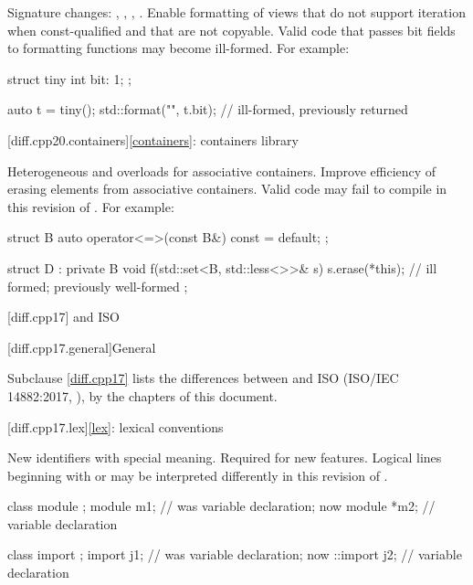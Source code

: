 \change
Signature changes: , , ,
.
\rationale
Enable formatting of views
that do not support iteration when const-qualified and
that are not copyable.
\effect
Valid \CppXX{} code that passes bit fields to formatting functions
may become ill-formed. For example:
\begin{codeblock}
struct tiny {
  int bit: 1;
};

auto t = tiny();
std::format("{}", t.bit);       // ill-formed, previously returned 
\end{codeblock}

[diff.cpp20.containers]{\ref{containers}: containers library}

\change
Heterogeneous  and  overloads
for associative containers.
\rationale
Improve efficiency of erasing elements from associative containers.
\effect
Valid \CppXX{} code may fail to compile in this revision of \Cpp{}.
For example:
\begin{codeblock}
struct B {
  auto operator<=>(const B&) const = default;
};

struct D : private B {
  void f(std::set<B, std::less<>>& s) {
    s.erase(*this);             // ill formed; previously well-formed
  }
};
\end{codeblock}

[diff.cpp17]{\Cpp{} and ISO \CppXVII{}}

[diff.cpp17.general]{General}

\pnum
{}%
Subclause \ref{diff.cpp17} lists the differences between \Cpp{} and
ISO \CppXVII{} (ISO/IEC 14882:2017, ),
by the chapters of this document.

[diff.cpp17.lex]{\ref{lex}: lexical conventions}

\change
New identifiers with special meaning.
\rationale
Required for new features.
\effect
Logical lines beginning with
 or  may
be interpreted differently
in this revision of \Cpp{}.
\begin{example}
\begin{codeblock}
class module {};
module m1;          // was variable declaration; now 
module *m2;         // variable declaration

class import {};
import j1;          // was variable declaration; now 
::import j2;        // variable declaration
\end{codeblock}
\end{example}

